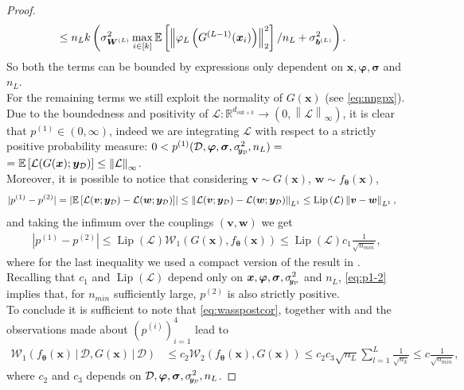 \documentclass[a4paper, 11pt, reqno]{amsart}
\theoremstyle{plain}
\theoremstyle{remark}
\theoremstyle{definition}
\newcommand{\mean}[2][\kern-0.5pt]{\mathbb{E}_{#1}\left[#2\right]}
\newcommand{\given}{\, | \,}
\newcommand{\wass}[3][2]{\mathcal{W}_{#1}\left(#2, #3\right)}
\newcommand{\real}{\mathbb{R}}
\newcommand{\norm}[1]{\left\lVert#1\right\rVert}
\newcommand{\lipschitz}[1]{\operatorname{Lip}\left(#1\right)}
\newcommand{\train}{\mathcal{D}}
\newcommand{\sigmay}{\sigma_{\scalebox{0.65}{$\kern-3pt\bm{y}_{\mathcal{D}}$}}}%
\begin{document}
\begin{proof}
\begin{align}
		& \leq n_L k \left(\sigma_{\bm{W}^{(L)}}^2 \max_{i \in [k]} \mean{\norm{\varphi_{L}\left(G^{(L - 1)}(\bm{x}_i)\right)}_2^2} / n_L + \sigma_{\bm{b}^{(L)}}^2\right).
	\end{align} 
	So both the terms can be bounded by expressions only dependent on $\bm{x}, \bm{\varphi}, \bm{\sigma}$ and $n_L$. \\
	For the remaining terms we still exploit the normality of $G(\bm{x})$ (see \cref{eq:nngpx}). 
	Due to the boundedness and positivity of $\mathcal{L}: \real^{d_{\mathrm{out} \times k}} \to (0, \norm{\mathcal{L}}_{\infty})$, it is clear that $p^{(1)} \in (0, \infty)$, indeed we are integrating $\mathcal{L}$ with respect to a strictly positive probability measure: $0 < p^{(1)}(\train, \bm{\varphi}, \bm{\sigma}, \sigmay^2, n_L) =$ $= \mean{\mathcal{L}(G(\bm{x}); \bm{y}_{\mathcal{D}})} \leq \norm{\mathcal{L}}_{\infty}$. \\
	Moreover, it is possible to notice that considering $\bm{v} \sim G(\bm{x})$, $\bm{w} \sim f_{\bm{\theta}}(\bm{x})$,
	\begin{align*}
		|p^{(1)} - p^{(2)}| & = \left|\mean{\mathcal{L}(\bm{v}; \bm{y}_{\mathcal{D}}) - \mathcal{L}(\bm{w}; \bm{y}_{\mathcal{D}})}\right| \leq \norm{\mathcal{L}(\bm{v}; \bm{y}_{\mathcal{D}}) - \mathcal{L}(\bm{w}; \bm{y}_{\mathcal{D}})}_{L^1} \leq \lipschitz{\mathcal{L}} \norm{\bm{v} - \bm{w}}_{L^1},
	\end{align*}
	and taking the infimum over the couplings $(\bm{v}, \bm{w})$ we get
	\begin{align} \label{eq:p1-2}
		|p^{(1)} - p^{(2)}| \leq \lipschitz{\mathcal{L}} \wass[1]{G(\bm{x})}{f_{\bm{\theta}}(\bm{x})} \leq \lipschitz{\mathcal{L}} c_1 \frac{1}{\sqrt{n_{min}}},
	\end{align}
	where for the last inequality we used a compact version of the result in . Recalling that $c_1$ and $\lipschitz{\mathcal{L}}$ depend only on $\bm{x}, \bm{\varphi}, \bm{\sigma}, \sigmay^2$ and $n_L$, \cref{eq:p1-2} implies that, for $n_{min}$ sufficiently large, $p^{(2)}$  is also strictly positive. \\
	To conclude it is sufficient to note that \cref{eq:wasspostcor}, together with  and the observations made about $(p^{(i)})_{i = 1}^4$ lead to
	\begin{align*}
		\wass[1]{f_{\bm{\theta}}(\bm{x}) \given \train}{G(\bm{x}) \given \train} & \leq c_2 \wass[2]{f_{\bm{\theta}}(\bm{x})}{G(\bm{x})} \leq c_2 c_3 \sqrt{n_L} \sum_{l = 1}^{L} \frac{1}{\sqrt{n_k}} \leq c \frac{1}{\sqrt{n_{min}}},
	\end{align*}
	where $c_2$ and $c_3$ depends on $\train, \bm{\varphi}, \bm{\sigma}, \sigmay^2, n_L$.
\end{proof}
\end{document}

